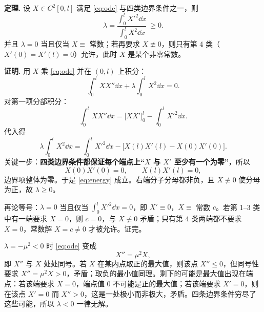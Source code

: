 \documentclass[11pt]{ctexart}
\let\orighdr\hdr
\renewcommand{\hdr}[2]{\needspace{12\baselineskip}\orighdr{#1}{#2}}
\let\origsubhdr\subhdr
\renewcommand{\subhdr}[1]{\needspace{3\baselineskip}\origsubhdr{#1}}
\begin{document}



\textbf{定理.} 设 $X\in C^2[0,l]$ 满足 \eqref{eq:ode} 与四类边界条件之一，则
\begin{equation}\label{eq:energy}
\lambda=\frac{\displaystyle\int_0^l X'^2\dd x}{\displaystyle\int_0^l X^2\dd x}\ \ge0 .
\end{equation}
并且 $\lambda=0$ 当且仅当 $X\equiv$ 常数；若再要求 $X\not\equiv0$，则只有第 4 类（$X'(0)=X'(l)=0$）允许，此时 $X$ 是某个非零常数。

\textbf{证明.} 用 $X$ 乘 \eqref{eq:ode} 并在 $(0,l)$ 上积分：
\[
\int_0^l XX''\dd x+\lambda\int_0^l X^2\dd x=0 .
\]
对第一项分部积分：
\[
\int_0^l XX''\dd x=\Big[XX'\Big]_0^l-\int_0^l X'^2\dd x .
\]
代入得
\[
\lambda\int_0^l X^2\dd x=\int_0^l X'^2\dd x-\Big[X(l)X'(l)-X(0)X'(0)\Big].
\]
关键一步：\textbf{四类边界条件都保证每个端点上“$X$ 与 $X'$ 至少有一个为零”}，所以
\[
X(0)X'(0)=0,\qquad X(l)X'(l)=0 ,
\]
边界项整体为零。于是 \eqref{eq:energy} 成立。右端分子分母都非负，且 $X\not\equiv0$ 使分母为正，故 $\lambda\ge0$。

再论等号：$\lambda=0$ 当且仅当 $\int_0^l X'^2\dd x=0$，即 $X'\equiv0$，$X\equiv$ 常数 $c$。若第 1--3 类中有一端要求 $X=0$，则 $c=0$，与 $X\not\equiv0$ 矛盾；只有第 4 类两端都不要求 $X=0$，常数解 $X=c\ne0$ 才被允许。证完。



$\lambda=-\mu^2<0$ 时 \eqref{eq:ode} 变成
\[
X''=\mu^2X ,
\]
即 $X''$ 与 $X$ 处处同号。若 $X$ 在某内点取正的最大值，则该点 $X''\le0$，但同号性要求 $X''=\mu^2X>0$，矛盾；取负的最小值同理。剩下的可能是最大值出现在端点：若该端要求 $X=0$，端点值 $0$ 不可能是正的最大值；若该端要求 $X'=0$，则在该点 $X'=0$ 而 $X''>0$，这是一处极小而非极大，矛盾。四条边界条件穷尽了这些可能，所以 $\lambda<0$ 一律无解。
\end{document}
